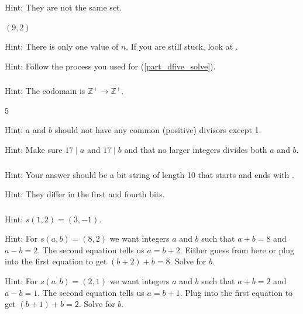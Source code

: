 \subsubsection*{ \answers}
\begin{apart}
    \item Hint: They are not the same set.
    \item $(9,2)$
    \item \label{part_dfive_solve} Hint: There is only one value of $n$. If you are still stuck, look at .
    \item Hint: Follow the process you used for (\ref{part_dfive_solve}).
\end{apart}

\subsubsection*{ \answers}
\begin{apart}
    \item Hint: The codomain is $\mathbb{Z}^+ \to \mathbb{Z}^+$.
    \item 5
    \item Hint: $a$ and $b$ should not have any common (positive) divisors except 1.
    \item Hint: Make sure $17 \mid a$ and $17 \mid b$ and that no larger integers divides both $a$ and $b$.
\end{apart}

\subsubsection*{ \answers}
\begin{apart}
    \item Hint: Your answer should be a bit string of length 10 that starts and ends with .
    \item Hint: They differ in the first and fourth bits.
\end{apart}

\subsubsection*{ \answers}
\begin{apart}
    \item Hint: $s(1,2)=(3,-1)$.
    \item Hint: For $s(a,b) = (8,2)$ we want integers $a$ and $b$ such that $a+b=8$ and $a-b=2$.  The second equation tells us $a = b+2$. Either guess from here or plug into the first equation to get $(b+2)+b=8$.  Solve for $b$.
    \item Hint: For $s(a,b) = (2,1)$ we want integers $a$ and $b$ such that $a+b=2$ and $a-b=1$.  The second equation tells us $a = b+1$. Plug into the first equation to get $(b+1)+b=2$.  Solve for $b$.
\end{apart}

